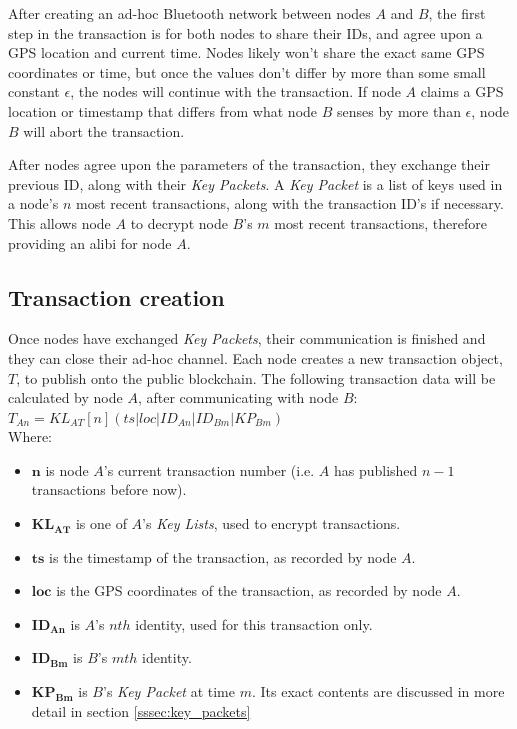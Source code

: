 After creating an ad-hoc Bluetooth network between nodes $A$ and $B$, the first step in the transaction is for both nodes to share their IDs, and agree upon a GPS location and current time. Nodes likely won't share the exact same GPS coordinates or time, but once the values don't differ by more than some small constant $\epsilon$, the nodes will continue with the transaction. If node $A$ claims a GPS location or timestamp that differs from what node $B$ senses by more than $\epsilon$, node $B$ will abort the transaction.

After nodes agree upon the parameters of the transaction, they exchange their previous ID, along with their \textit{Key Packets}. A \textit{Key Packet} is a list of keys used in a node's $n$ most recent transactions, along with the transaction ID's if necessary. This allows node $A$ to decrypt node $B$'s $m$ most recent transactions, therefore providing an alibi for node $A$.

\subsection{Transaction creation}
Once nodes have exchanged \textit{Key Packets}, their communication is finished and they can close their ad-hoc channel. Each node creates a new transaction object, $T$, to publish onto the public blockchain. The following transaction data will be calculated by node $A$, after communicating with node $B$:
\\

$T_{An} = KL_{AT}[n](ts|loc|ID_{An}|ID_{Bm}|KP_{Bm})$
\\

Where:
\begin{itemize}[noitemsep,topsep=0pt]
	\item[] $\mathbf{n}$ is node $A$'s current transaction number (i.e. $A$ has published $n-1$ transactions before now).
	\item[] $\mathbf{KL_{AT}}$ is one of $A$'s \textit{Key Lists}, used to encrypt transactions.	
	\item[] $\mathbf{ts}$ is the timestamp of the transaction, as recorded by node $A$.
	\item[] $\mathbf{loc}$ is the GPS coordinates of the transaction, as recorded by node $A$.
	\item[] $\mathbf{ID_{An}}$ is $A$'s $nth$ identity, used for this transaction only.
	\item[] $\mathbf{ID_{Bm}}$ is $B$'s $mth$ identity.
	\item[] $\mathbf{KP_{Bm}}$ is $B$'s \textit{Key Packet} at time $m$. Its exact contents are discussed in more detail in section \ref{sssec:key_packets}
\end{itemize}

